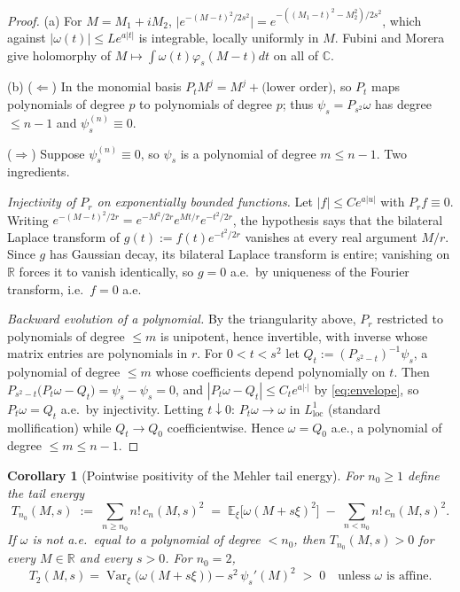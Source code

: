 \documentclass[11pt]{article}
\newtheorem{corollary}{Corollary}
\theoremstyle{remark}
\newcommand{\E}{\mathbb{E}}
\newcommand{\R}{\mathbb{R}}
\newcommand{\Var}{\operatorname{Var}}
\begin{document}
\begin{proof}
(a) For $M = M_1 + iM_2$, $\big|e^{-(M-t)^2/2s^2}\big| = e^{-((M_1-t)^2 - M_2^2)/2s^2}$, which against $|\omega(t)| \le Le^{a|t|}$ is integrable, locally uniformly in $M$. Fubini and Morera give holomorphy of $M \mapsto \int\omega(t)\varphi_s(M-t)dt$ on all of $\mathbb C$.

(b) ($\Leftarrow$) In the monomial basis $P_t M^j = M^j + \text{(lower order)}$, so $P_t$ maps polynomials of degree $p$ to polynomials of degree $p$; thus $\psi_s = P_{s^2}\omega$ has degree $\le n-1$ and $\psi_s^{(n)} \equiv 0$.

($\Rightarrow$) Suppose $\psi_s^{(n)} \equiv 0$, so $\psi_s$ is a polynomial of degree $m \le n-1$. Two ingredients.

\emph{Injectivity of $P_r$ on exponentially bounded functions.} Let $|f| \le Ce^{a|u|}$ with $P_rf \equiv 0$. Writing $e^{-(M-t)^2/2r} = e^{-M^2/2r}e^{Mt/r}e^{-t^2/2r}$, the hypothesis says that the bilateral Laplace transform of $g(t) := f(t)e^{-t^2/2r}$ vanishes at every real argument $M/r$. Since $g$ has Gaussian decay, its bilateral Laplace transform is entire; vanishing on $\R$ forces it to vanish identically, so $g = 0$ a.e.\ by uniqueness of the Fourier transform, i.e.\ $f = 0$ a.e.

\emph{Backward evolution of a polynomial.} By the triangularity above, $P_r$ restricted to polynomials of degree $\le m$ is unipotent, hence invertible, with inverse whose matrix entries are polynomials in $r$. For $0 < t < s^2$ let $Q_t := (P_{s^2-t})^{-1}\psi_s$, a polynomial of degree $\le m$ whose coefficients depend polynomially on $t$. Then $P_{s^2-t}\big(P_t\omega - Q_t\big) = \psi_s - \psi_s = 0$, and $|P_t\omega - Q_t| \le C_te^{a|\cdot|}$ by \eqref{eq:envelope}, so $P_t\omega = Q_t$ a.e.\ by injectivity. Letting $t \downarrow 0$: $P_t\omega \to \omega$ in $L^1_{\mathrm{loc}}$ (standard mollification) while $Q_t \to Q_0$ coefficientwise. Hence $\omega = Q_0$ a.e., a polynomial of degree $\le m \le n-1$.
\end{proof}

\begin{corollary}[Pointwise positivity of the Mehler tail energy]\label{cor:tail}
For $n_0 \ge 1$ define the \emph{tail energy}
\[
T_{n_0}(M,s) \;:=\; \sum_{n \ge n_0} n!\,c_n(M,s)^2 \;=\; \E_\xi\big[\omega(M+s\xi)^2\big] \;-\; \sum_{n < n_0} n!\,c_n(M,s)^2 .
\]
If $\omega$ is not a.e.\ equal to a polynomial of degree $< n_0$, then $T_{n_0}(M,s) > 0$ for \emph{every} $M \in \R$ and every $s > 0$. For $n_0 = 2$,
\[
T_2(M,s) = \Var_\xi\big(\omega(M+s\xi)\big) - s^2\,\psi_s'(M)^2 \;>\; 0 \quad\text{unless } \omega \text{ is affine.}
\]
\end{corollary}
\end{document}
